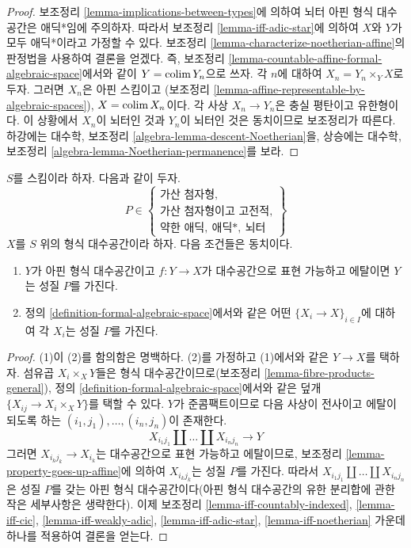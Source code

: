 \begin{proof}
보조정리 \ref{lemma-implications-between-types}에 의하여 뇌터 아핀
형식 대수공간은 애딕*임에 주의하자. 따라서 보조정리
\ref{lemma-iff-adic-star}에 의하여 $X$와 $Y$가 모두 애딕*이라고
가정할 수 있다. 보조정리
\ref{lemma-characterize-noetherian-affine}의 판정법을 사용하여
결론을 얻겠다. 즉, 보조정리
\ref{lemma-countable-affine-formal-algebraic-space}에서와 같이
$Y = \mathop{\mathrm{colim}}\nolimits Y_n$으로 쓰자. 각 $n$에 대하여
$X_n = Y_n \times_Y X$로 두자. 그러면 $X_n$은 아핀 스킴이고
(보조정리 \ref{lemma-affine-representable-by-algebraic-spaces}),
$X = \mathop{\mathrm{colim}}\nolimits X_n$이다. 각 사상 $X_n \to Y_n$은 충실 평탄이고
유한형이다. 이 상황에서 $X_n$이 뇌터인 것과 $Y_n$이 뇌터인 것은
동치이므로 보조정리가 따른다. 하강에는 대수학, 보조정리
\ref{algebra-lemma-descent-Noetherian}을, 상승에는 대수학, 보조정리
\ref{algebra-lemma-Noetherian-permanence}를 보라.
\end{proof}

\begin{lemma}
\label{lemma-type-local}
$S$를 스킴이라 하자. 다음과 같이 두자.
$$
P \in
\left\{
\begin{matrix}
\text{가산 첨자형},\\
\text{가산 첨자형이고 고전적},\\
\text{약한 애딕},\ \text{애딕*},\ \text{뇌터}
\end{matrix}
\right\}
$$
$X$를 $S$ 위의 형식 대수공간이라 하자. 다음 조건들은 동치이다.
\begin{enumerate}
\item $Y$가 아핀 형식 대수공간이고 $f : Y \to X$가 대수공간으로
표현 가능하고 에탈이면 $Y$는 성질 $P$를 가진다.
\item 정의 \ref{definition-formal-algebraic-space}에서와 같은 어떤
$\{X_i \to X\}_{i \in I}$에 대하여 각 $X_i$는 성질 $P$를 가진다.
\end{enumerate}
\end{lemma}

\begin{proof}
(1)이 (2)를 함의함은 명백하다. (2)를 가정하고 (1)에서와 같은
$Y \to X$를 택하자. 섬유곱 $X_i \times_X Y$들은 형식
대수공간이므로(보조정리 \ref{lemma-fibre-products-general}), 정의
\ref{definition-formal-algebraic-space}에서와 같은 덮개
$\{X_{ij} \to X_i \times_X Y\}$를 택할 수 있다. $Y$가
준콤팩트이므로 다음 사상이 전사이고 에탈이 되도록 하는
$(i_1, j_1), \ldots, (i_n, j_n)$이 존재한다.
$$
X_{i_1 j_1} \amalg \ldots \amalg X_{i_n j_n} \longrightarrow Y
$$
그러면 $X_{i_kj_k} \to X_{i_k}$는 대수공간으로 표현 가능하고
에탈이므로, 보조정리 \ref{lemma-property-goes-up-affine}에 의하여
$X_{i_kj_k}$는 성질 $P$를 가진다. 따라서
$X_{i_1 j_1} \amalg \ldots \amalg X_{i_n j_n}$은 성질 $P$를 갖는
아핀 형식 대수공간이다(아핀 형식 대수공간의 유한 분리합에 관한
작은 세부사항은 생략한다). 이제 보조정리
\ref{lemma-iff-countably-indexed},
\ref{lemma-iff-cic},
\ref{lemma-iff-weakly-adic},
\ref{lemma-iff-adic-star},
\ref{lemma-iff-noetherian} 가운데 하나를 적용하여 결론을 얻는다.
\end{proof}

